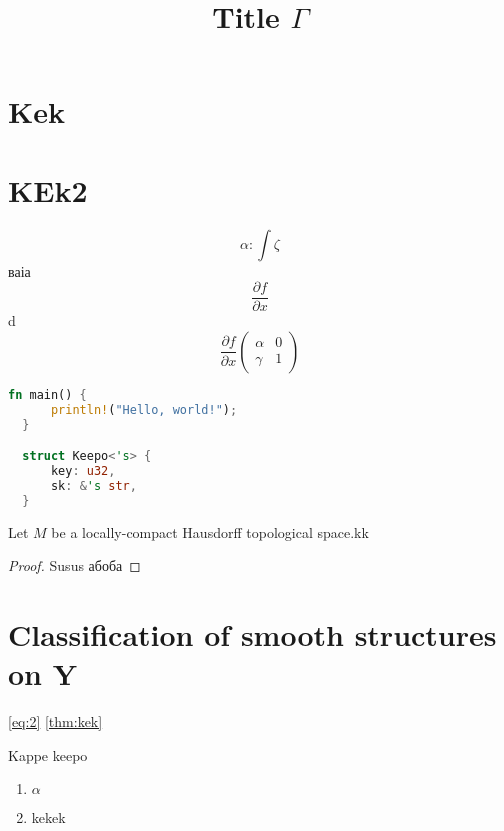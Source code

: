 

\title{Title $\Gamma$}


\maketitle
{}

\section{Kek}

\section{KEk2}
$$\alpha\colon\int\zeta$$
ваіа
\[
  \frac{\partial f}{\partial x}
\]
d
\begin{equation}\label{eq:2}
  \frac{\partial f}{\partial x}
  \begin{pmatrix}
    \alpha & 0\\ 
    \gamma & 1
  \end{pmatrix}
\end{equation}

\begin{lstlisting}[language=Rust]
  fn main() {
      println!("Hello, world!");
  }

  struct Keepo<'s> {
      key: u32,
      sk: &'s str,
  }
\end{lstlisting}


\begin{lemma}[test]\label{thm:kek}
  Let $M$ be a locally-compact Hausdorff topological space.kk\cite{einstein}
	
\end{lemma}
\begin{proof}
  Susus абоба
\end{proof}
\section{Classification of smooth structures on Y}


\cref{eq:2}
\cref{thm:kek}

Kappe keepo
\begin{mdframed}
  \begin{enumerate}[label=(\roman*),leftmargin=*]
    \item $\alpha$
    \item kekek

  \end{enumerate}
\end{mdframed}
	
\printbibliography

